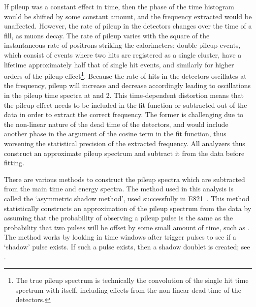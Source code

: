 If pileup was a constant effect in time, then the phase of the time histogram would be shifted by some constant amount, and the \wa frequency extracted would be unaffected. However, the rate of pileup in the detectors changes over the time of a fill, as muons decay. The rate of pileup varies with the square of the instantaneous rate of positrons striking the calorimeters; double pileup events, which consist of events where two hits are registered as a single cluster, have a lifetime approximately half that of single hit events, and similarly for higher orders of the pileup effect\footnote{The true pileup spectrum is technically the convolution of the single hit time spectrum with itself, including effects from the non-linear dead time of the detectors.}. Because the rate of hits in the detectors oscillates at the \gmtwo frequency, pileup will increase and decrease accordingly leading to oscillations in the pileup time spectra at \wa and 2\wa. This time-dependent distortion means that the pileup effect needs to be included in the fit function or subtracted out of the data in order to extract the correct \wa frequency. The former is challenging due to the non-linear nature of the dead time of the detectors, and would include another phase in the argument of the cosine term in the fit function, thus worsening the statistical precision of the extracted \wa frequency. All analyzers thus construct an approximate pileup spectrum and subtract it from the data before fitting.






There are various methods to construct the pileup spectra which are subtracted from the main time and energy spectra. The method used in this analysis is called the `asymmetric shadow method', used successfully in E821~\cite{E821PileupShadow}. This method statistically constructs an approximation of the pileup spectrum from the data by assuming that the probability of observing a pileup pulse is the same as the probability that two pulses will be offset by some small amount of time, such as . The method works by looking in time windows after trigger pulses to see if a `shadow' pulse exists. If such a pulse exists, then a shadow doublet is created; see . 

